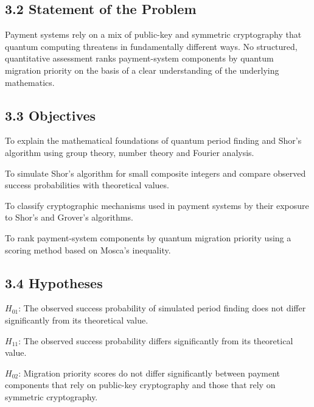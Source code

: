 \documentclass[12pt,oneside]{report}
\begin{document}
\subsection*{3.2 Statement of the Problem}

Payment systems rely on a mix of public-key and symmetric cryptography that quantum computing threatens in fundamentally different ways. No structured, quantitative assessment ranks payment-system components by quantum migration priority on the basis of a clear understanding of the underlying mathematics.
\par

\subsection*{3.3 Objectives}

To explain the mathematical foundations of quantum period finding and Shor's algorithm using group theory, number theory and Fourier analysis.
\par

To simulate Shor's algorithm for small composite integers and compare observed success probabilities with theoretical values.
\par

To classify cryptographic mechanisms used in payment systems by their exposure to Shor's and Grover's algorithms.
\par

To rank payment-system components by quantum migration priority using a scoring method based on Mosca's inequality.
\par

\subsection*{3.4 Hypotheses}

$H_{01}$: The observed success probability of simulated period finding does not differ significantly from its theoretical value.
\par

$H_{11}$: The observed success probability differs significantly from its theoretical value.
\par

$H_{02}$: Migration priority scores do not differ significantly between payment components that rely on public-key cryptography and those that rely on symmetric cryptography.
\par
\end{document}
